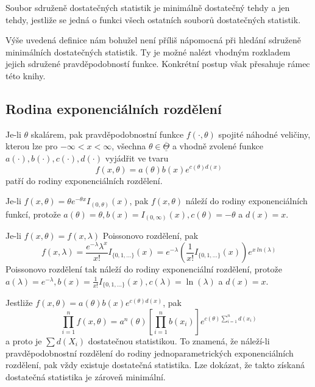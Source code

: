 \begin{theorem}
Soubor sdruženě dostatečných statistik je minimálně dostatečný tehdy a jen tehdy, jestliže se jedná o funkci všech ostatních souborů dostatečných statistik.
\end{theorem}

Výše uvedená definice nám bohužel není příliš nápomocná při hledání sdruženě minimálních dostatečných statistik. Ty je možné nalézt vhodným rozkladem jejich sdružené pravděpodobností funkce. Konkrétní postup však přesahuje rámec této knihy.

\subsection{Rodina exponenciálních rozdělení}

\begin{definition}
Je-li $\theta$ skalárem, pak pravděpodobnostní funkce $f(\cdot, \theta)$ spojité náhodné veličiny, kterou lze pro $-\infty < x < \infty$, všechna $\theta \in \overline{\underline{\Theta}}$ a vhodně zvolené funkce $a(\cdot), b(\cdot), c(\cdot), d(\cdot)$ vyjádřit ve tvaru
\begin{equation*}
f(x, \theta) = a(\theta)b(x)e^{c(\theta) d(x)}
\end{equation*}
patří do rodiny exponenciálních rozdělení.
\end{definition}

\begin{example}
Je-li $f(x, \theta) = \theta e^{- \theta x}I_{(0, \theta)}(x)$, pak $f(x, \theta)$ náleží do rodiny exponenciálních funkcí, protože $a(\theta) = \theta, b(x) = I_{(0, \infty)}(x), c(\theta) = - \theta$ a $d(x) = x$.
\end{example}

\begin{example}
Je-li $f(x, \theta) = f(x, \lambda)$ Poissonovo rozdělení, pak
\begin{equation*}
f(x, \lambda) = \frac{e^{-\lambda}\lambda^x}{x!}I_{\{0, 1, ... \}}(x) = e^{-\lambda}\left(\frac{1}{x!}I_{\{0, 1, ...\}}(x)\right)e^{x~ln(\lambda)}
\end{equation*}
Poissonovo rozdělení tak náleží do rodiny exponenciální rozdělení, protože $a(\lambda) = e^{-\lambda}, b(x) = \frac{1}{x!}I_{\{0, 1, ...\}}(x), c(\lambda) = \ln(\lambda)$ a $d(x) = x$.
\end{example}

Jestliže $f(x, \theta) = a(\theta)b(x)e^{c(\theta)d(x)}$, pak
\begin{equation*}
\prod_{i = 1}^n f(x, \theta) = a^n(\theta)\left[\prod_{i = 1}^n b(x_i) \right]e^{c(\theta) \sum_{i = 1}^n d(x_i)}
\end{equation*}
a proto je $\sum d(X_i)$ dostatečnou statistikou. To znamená, že náleží-li pravděpodobnostní rozdělení do rodiny jednoparametrických exponenciálních rozdělení, pak vždy existuje dostatečná statistika. Lze dokázat, že takto získaná dostatečná statistika je zároveň minimální.

